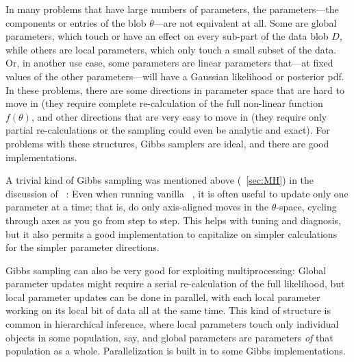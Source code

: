 \documentclass[modern]{aastex61}
\newcommand{\MCMC}{\acronym{MCMC}}
\newcommand{\MH}{\acronym{M--H}}
\newcommand{\data}{D}
\newcommand{\pars}{\theta}
\begin{document}
In many problems that have large numbers of parameters,
  the parameters---the components or entries of the
  blob $\pars$---are not equivalent at all.
Some are global parameters, which touch or have an effect on every
sub-part of the data blob $\data$, while others are local parameters,
which only touch a small subset of the data.
Or, in another use case, some parameters are linear parameters
that---at fixed values of the other parameters---will have a Gaussian
likelihood or posterior pdf.
In these problems, there are some directions in parameter space that
are hard to move in (they require complete re-calculation of the full
non-linear function $f(\pars)$, and other directions that are very
easy to move in (they require only partial re-calculations or the
sampling could even be analytic and exact).
For problems with these structures, Gibbs samplers are ideal, and
there are good implementations.

A trivial kind of Gibbs sampling was mentioned above (\sectionname~\ref{sec:MH}) in the
discussion of \MH\ \MCMC:
Even when running vanilla \MH\ \MCMC, it is often useful to update only
one parameter at a time; that is, do only axis-aligned moves in the
$\pars$-space, cycling through axes as you go from step to step.
This helps with tuning and diagnosis, but it also permits a good
implementation to capitalize on simpler calculations for the simpler
parameter directions.

Gibbs sampling can also be very good for exploiting multiprocessing:
Global parameter updates might require a serial re-calculation of the
full likelihood, but local parameter updates can be done in parallel,
with each local parameter working on its local bit of data all at the
same time.
This kind of structure is common in hierarchical inference, where
local parameters touch only individual objects in some population,
say, and global parameters are parameters \emph{of} that population as
a whole.
Parallelization is built in to some Gibbs implementations.
\end{document}

